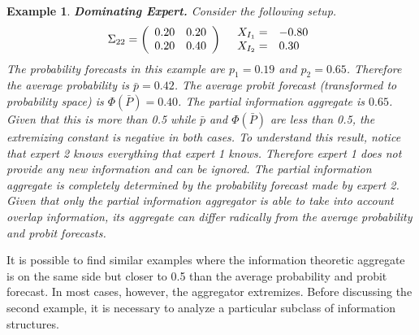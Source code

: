 \documentclass[11pt,twoside]{article}
\newtheorem{example}[theorem]{Example}
\begin{document}
\begin{example}
\textbf{Dominating Expert.} Consider the following setup.
\begin{align*}
\Sigma_{22} =  \left(\begin{array}{c c}
0.20 & 0.20\\
0.20 & 0.40 \\
 \end{array}\right)
  && 
  \begin{array}{l l}
X_{I_1} =& -0.80\\
X_{I_2} =& 0.30
 \end{array}
\end{align*}
The probability forecasts in this example are $p_1 = 0.19$ and $p_2 = 0.65$. Therefore the average probability is $\bar{p} = 0.42$. The average probit forecast (transformed to probability space) is $\Phi(\bar{P}) = 0.40$. 
The partial information aggregate is $0.65$.  Given that this is more than 0.5 while $\bar{p}$ and $\Phi(\bar{P})$ are less than 0.5, the extremizing constant is negative in both cases. To understand this result, notice that expert 2 knows everything that expert 1 knows. Therefore expert 1 does not provide any new information and can be ignored. The partial information aggregate is completely determined by the probability forecast made by expert 2. Given that only the partial information aggregator is able to take into account overlap information, its aggregate can differ radically from the average probability and probit forecasts. 
\end{example}

It is possible to find similar examples where the information theoretic aggregate is on the same side but closer to 0.5 than the average probability and probit forecast. In most cases, however, the aggregator extremizes. Before discussing the second example, it is necessary to analyze a particular subclass of information structures. 
\end{document}
